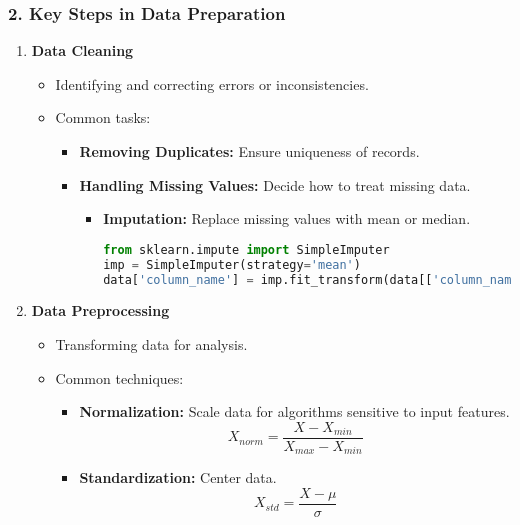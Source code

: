 \documentclass{beamer}
\begin{document}
\begin{frame}
    \frametitle{2. Key Steps in Data Preparation}
    \begin{enumerate}
        \item \textbf{Data Cleaning}
        \begin{itemize}
            \item Identifying and correcting errors or inconsistencies.
            \item Common tasks:
            \begin{itemize}
                \item \textbf{Removing Duplicates:} Ensure uniqueness of records.
                \item \textbf{Handling Missing Values:} Decide how to treat missing data.
                \begin{itemize}
                    \item \textbf{Imputation:} Replace missing values with mean or median.
                    \begin{lstlisting}[language=Python]
from sklearn.impute import SimpleImputer
imp = SimpleImputer(strategy='mean')
data['column_name'] = imp.fit_transform(data[['column_name']])
                    \end{lstlisting}
                \end{itemize}
            \end{itemize}
        \end{itemize}
        
        \item \textbf{Data Preprocessing}
        \begin{itemize}
            \item Transforming data for analysis.
            \item Common techniques:
            \begin{itemize}
                \item \textbf{Normalization:} Scale data for algorithms sensitive to input features.
                \begin{equation}
                    X_{norm} = \frac{X - X_{min}}{X_{max} - X_{min}}
                \end{equation}
                
                \item \textbf{Standardization:} Center data.
                \begin{equation}
                    X_{std} = \frac{X - \mu}{\sigma}
                \end{equation}
            \end{itemize}
        \end{itemize}
        

\end{enumerate}
\end{frame}
\end{document}
